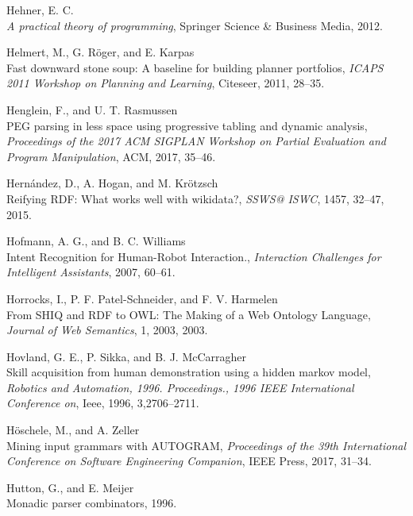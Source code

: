 \documentclass[11pt,a4paper,twoside,openright,titlepage,numbers=noenddot,headinclude,cleardoublepage=empty,openany]{scrreprt}
\theoremstyle{plain}
\theoremstyle{definition}
\theoremstyle{remark}
\begin{document}
\leavevmode\hypertarget{ref-hehner_practical_2012}{}%
Hehner, E. C.\\
\emph{A practical theory of programming}, Springer Science \& Business
Media, 2012.

\leavevmode\hypertarget{ref-helmert_fast_2011}{}%
Helmert, M., G. Röger, and E. Karpas\\
Fast downward stone soup: A baseline for building planner portfolios,
\emph{ICAPS 2011 Workshop on Planning and Learning}, Citeseer, 2011,
28--35.

\leavevmode\hypertarget{ref-henglein_peg_2017}{}%
Henglein, F., and U. T. Rasmussen\\
PEG parsing in less space using progressive tabling and dynamic
analysis, \emph{Proceedings of the 2017 ACM SIGPLAN Workshop on Partial
Evaluation and Program Manipulation}, ACM, 2017, 35--46.

\leavevmode\hypertarget{ref-hernandez_reifying_2015}{}%
Hernández, D., A. Hogan, and M. Krötzsch\\
Reifying RDF: What works well with wikidata?, \emph{SSWS@ ISWC}, 1457,
32--47, 2015.

\leavevmode\hypertarget{ref-hofmann_intent_2007a}{}%
Hofmann, A. G., and B. C. Williams\\
Intent Recognition for Human-Robot Interaction., \emph{Interaction
Challenges for Intelligent Assistants}, 2007, 60--61.

\leavevmode\hypertarget{ref-horrocks_shiq_2003}{}%
Horrocks, I., P. F. Patel-Schneider, and F. V. Harmelen\\
From SHIQ and RDF to OWL: The Making of a Web Ontology Language,
\emph{Journal of Web Semantics}, 1, 2003, 2003.

\leavevmode\hypertarget{ref-hovland_skill_1996}{}%
Hovland, G. E., P. Sikka, and B. J. McCarragher\\
Skill acquisition from human demonstration using a hidden markov model,
\emph{Robotics and Automation, 1996. Proceedings., 1996 IEEE
International Conference on}, Ieee, 1996, 3,2706--2711.

\leavevmode\hypertarget{ref-hoschele_mining_2017}{}%
Höschele, M., and A. Zeller\\
Mining input grammars with AUTOGRAM, \emph{Proceedings of the 39th
International Conference on Software Engineering Companion}, IEEE Press,
2017, 31--34.

\leavevmode\hypertarget{ref-hutton_monadic_1996}{}%
Hutton, G., and E. Meijer\\
Monadic parser combinators, 1996.
\end{document}
